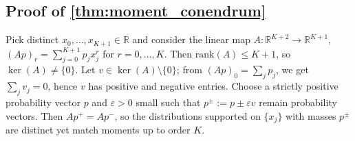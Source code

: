 \subsection{Proof of \cref{thm:moment_conendrum}}
\label{proof:moment_conendrum}


Pick distinct $x_0,\dots,x_{K+1}\in\mathbb{R}$ and consider the linear map
$A:\mathbb{R}^{K+2}\to\mathbb{R}^{K+1}$, $(Ap)_r=\sum_{j=0}^{K+1} p_j x_j^r$ for $r=0,\dots,K$.
Then $\mathrm{rank}(A)\le K+1$, so $\ker(A)\neq\{0\}$. Let $v\in\ker(A)\setminus\{0\}$; from $(Ap)_0=\sum_j p_j$, we get $\sum_j v_j=0$, hence $v$ has positive and negative entries. Choose a strictly positive probability vector $p$ and $\varepsilon>0$ small such that $p^\pm:=p\pm\varepsilon v$ remain probability vectors. Then $Ap^+=Ap^-$, so the distributions supported on $\{x_j\}$ with masses $p^\pm$ are distinct yet match moments up to order $K$.


